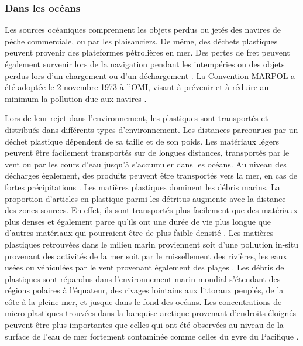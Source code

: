 \subsubsection{Dans les oc\'eans}
\par{
Les sources oc\'eaniques comprennent les objets perdus ou jet\'es des navires de p\^eche commerciale, ou par les plaisanciers. De m\^eme, des d\'echets plastiques peuvent provenir des plateformes p\'etroli\`eres en mer. Des pertes de fret peuvent \'egalement survenir lors de la navigation pendant les intemp\'eries ou des objets perdus lors d'un chargement ou d'un d\'echargement {\citep{lambert2014occurrence}}. La Convention MARPOL a \'et\'e adopt\'ee le 2 novembre 1973 \`a l'OMI, visant \`a pr\'evenir et \`a r\'eduire au minimum la pollution due aux navires {\citep{OMI}}.
}
\par{
Lors de leur rejet dans l'environnement, les plastiques sont transport\'es et distribu\'es dans diff\'erents types d'environnement. Les distances parcourues par un d\'echet plastique d\'ependent de sa taille et de son poids. Les mat\'eriaux l\'egers peuvent \^etre facilement transport\'es sur de longues distances, transport\'es par le vent ou par les cours d'eau jusqu'\`a s'accumuler dans les oc\'eans. Au niveau des d\'echarges \'egalement, des produits peuvent \^etre transport\'es vers la mer, en cas de fortes pr\'ecipitations {\citep{lambert2014occurrence}}. Les mati\`eres plastiques dominent les d\'ebris marins. La proportion d'articles en plastique parmi les d\'etritus augmente avec la distance des zones sources. En effet, ils sont transport\'es plus facilement que des mat\'eriaux plus denses et \'egalement parce qu'ils ont une dur\'ee de vie plus longue que d'autres mat\'eriaux qui pourraient \^etre de plus faible densit\'e {\citep{ryan2009monitoring}}. Les mati\`eres plastiques retrouv\'ees dans le milieu marin proviennent soit d'une pollution in-situ provenant des activit\'es de la mer soit par le ruissellement des rivi\`eres, les eaux us\'ees ou v\'ehicul\'ees par le vent provenant \'egalement des plages {\citep{ryan2009monitoring}}. Les d\'ebris de plastiques sont r\'epandus dans l'environnement marin mondial s'\'etendant des r\'egions polaires \`a l'\'equateur, des rivages lointains aux littoraux peupl\'es, de la c\^ote \`a la pleine mer, et jusque dans le fond des oc\'eans. Les concentrations de micro-plastiques trouv\'ees dans la banquise arctique provenant d'endroits \'eloign\'es peuvent \^etre plus importantes que celles qui ont \'et\'e observ\'ees au niveau de la surface de l'eau de mer fortement contamin\'ee comme celles du gyre du Pacifique {\citep{wang2016behaviors}}.
}

